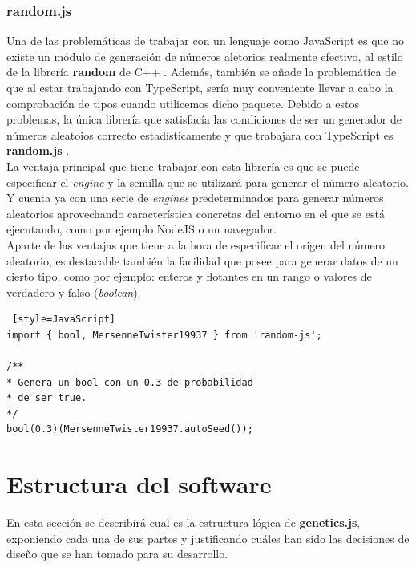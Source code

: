 \subsubsection{random.js}

Una de las problemáticas de trabajar con un lenguaje como JavaScript es que no existe un módulo de generación de números aletorios realmente efectivo, al estilo de la librería \textbf{random} de C++ \cite{randomcpp}. Además, también se añade la problemática de que al estar trabajando con TypeScript, sería muy conveniente llevar a cabo la comprobación de tipos cuando utilicemos dicho paquete. Debido a estos problemas, la única librería que satisfacía las condiciones de ser un generador de números aleatoios correcto estadísticamente y que trabajara con TypeScript es \textbf{random.js} \cite{randomjs}. \\

La ventaja principal que tiene trabajar con esta librería es que se puede especificar el \textit{engine} y la semilla que se utilizará para generar el número aleatorio. Y cuenta ya con una serie de \textit{engines} predeterminados para generar números aleatorios aprovechando característica concretas del entorno en el que se está ejecutando, como por ejemplo NodeJS o un navegador. \\

Aparte de las ventajas que tiene a la hora de especificar el origen del número aleatorio, es destacable también la facilidad que posee para generar datos de un cierto tipo, como por ejemplo: enteros y flotantes en un rango o valores de verdadero y falso (\textit{boolean}). \\

\begin{lstlisting} [style=JavaScript]
import { bool, MersenneTwister19937 } from 'random-js';

/**
* Genera un bool con un 0.3 de probabilidad
* de ser true.
*/
bool(0.3)(MersenneTwister19937.autoSeed());
\end{lstlisting}

\section{Estructura del software}
\label{4:sec:2}

En esta sección se describirá cual es la estructura lógica de \textbf{genetics.js}, exponiendo cada una de sus partes y justificando cuáles han sido las decisiones de diseño que se han tomado para su desarrollo.

